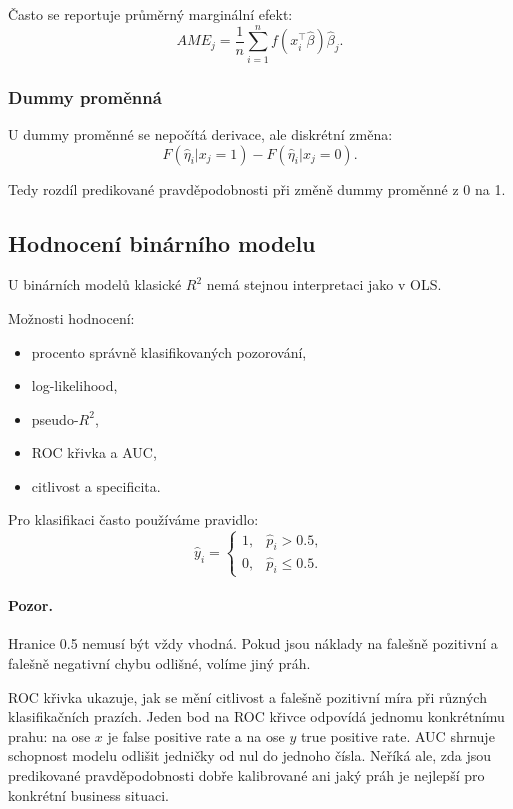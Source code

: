 Často se reportuje průměrný marginální efekt:
\[
AME_j
=
\frac{1}{n}
\sum_{i=1}^n
f(x_i^\top\hat\beta)\hat\beta_j.
\]

\subsubsection{Dummy proměnná}

U dummy proměnné se nepočítá derivace, ale diskrétní změna:
\[
F(\hat\eta_i|x_j=1)-F(\hat\eta_i|x_j=0).
\]

Tedy rozdíl predikované pravděpodobnosti při změně dummy proměnné z 0 na 1.

\subsection{Hodnocení binárního modelu}

U binárních modelů klasické $R^2$ nemá stejnou interpretaci jako v OLS.

Možnosti hodnocení:
\begin{itemize}
    \item procento správně klasifikovaných pozorování,
    \item log-likelihood,
    \item pseudo-$R^2$,
    \item ROC křivka a AUC,
    \item citlivost a specificita.
\end{itemize}

Pro klasifikaci často používáme pravidlo:
\[
\hat y_i=
\begin{cases}
1, & \hat p_i>0.5,\\
0, & \hat p_i\leq 0.5.
\end{cases}
\]

\paragraph{Pozor.}
Hranice 0.5 nemusí být vždy vhodná. Pokud jsou náklady na falešně pozitivní a falešně negativní chybu
odlišné, volíme jiný práh.

ROC křivka ukazuje, jak se mění citlivost a falešně pozitivní míra při různých klasifikačních prazích.
Jeden bod na ROC křivce odpovídá jednomu konkrétnímu prahu: na ose \(x\) je false positive rate a na
ose \(y\) true positive rate. AUC shrnuje schopnost modelu odlišit jedničky od nul do jednoho čísla.
Neříká ale, zda jsou predikované pravděpodobnosti dobře kalibrované ani jaký práh je nejlepší pro
konkrétní business situaci.

